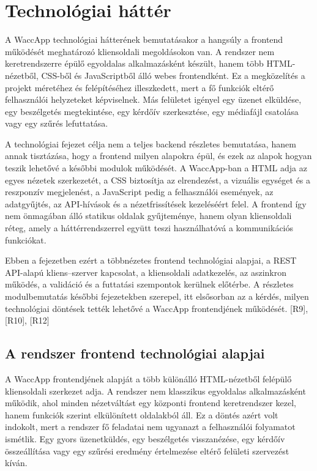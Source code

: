 \chapter{Technológiai háttér}

A WaccApp technológiai hátterének bemutatásakor a hangsúly a frontend működését meghatározó kliensoldali megoldásokon van. A rendszer nem keretrendszerre épülő egyoldalas alkalmazásként készült, hanem több HTML-nézetből, CSS-ből és JavaScriptből álló webes frontendként. Ez a megközelítés a projekt méretéhez és felépítéséhez illeszkedett, mert a fő funkciók eltérő felhasználói helyzeteket képviselnek. Más felületet igényel egy üzenet elküldése, egy beszélgetés megtekintése, egy kérdőív szerkesztése, egy médiafájl csatolása vagy egy szűrés lefuttatása.

A technológiai fejezet célja nem a teljes backend részletes bemutatása, hanem annak tisztázása, hogy a frontend milyen alapokra épül, és ezek az alapok hogyan teszik lehetővé a későbbi modulok működését. A WaccApp-ban a HTML adja az egyes nézetek szerkezetét, a CSS biztosítja az elrendezést, a vizuális egységet és a reszponzív megjelenést, a JavaScript pedig a felhasználói események, az adatgyűjtés, az API-hívások és a nézetfrissítések kezeléséért felel. A frontend így nem önmagában álló statikus oldalak gyűjteménye, hanem olyan kliensoldali réteg, amely a háttérrendszerrel együtt teszi használhatóvá a kommunikációs funkciókat.

Ebben a fejezetben ezért a többnézetes frontend technológiai alapjai, a REST API-alapú kliens–szerver kapcsolat, a kliensoldali adatkezelés, az aszinkron működés, a validáció és a futtatási szempontok kerülnek előtérbe. A részletes modulbemutatás későbbi fejezetekben szerepel, itt elsősorban az a kérdés, milyen technológiai döntések tették lehetővé a WaccApp frontendjének működését. [R9], [R10], [R12]

\section{A rendszer frontend technológiai alapjai}

A WaccApp frontendjének alapját a több különálló HTML-nézetből felépülő kliensoldali szerkezet adja. A rendszer nem klasszikus egyoldalas alkalmazásként működik, ahol minden nézetváltást egy központi frontend keretrendszer kezel, hanem funkciók szerint elkülönített oldalakból áll. Ez a döntés azért volt indokolt, mert a rendszer fő feladatai nem ugyanazt a felhasználói folyamatot ismétlik. Egy gyors üzenetküldés, egy beszélgetés visszanézése, egy kérdőív összeállítása vagy egy szűrési eredmény értelmezése eltérő felületi szervezést kíván.


